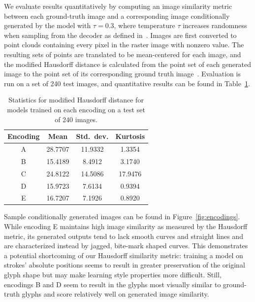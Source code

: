 We evaluate results quantitatively by computing an image similarity metric between each ground-truth image and a corresponding image conditionally generated by the model with $\tau = 0.3$, where temperature $\tau$ increases randomness when sampling from the decoder as defined in~\cite{ha2017neural}.
Images are first converted to point clouds containing every pixel in the raster image with nonzero value.
The resulting sets of points are translated to be mean-centered for each image, and the modified Hausdorff distance is calculated from the point set of each generated image to the point set of its corresponding ground truth image~\cite{dubuisson1994modified}.
Evaluation is run on a set of 240 test images, and quantitative results can be found in Table~\ref{tbl:encoding-results}.

\begin{table}[t]
\centering
\caption[Quantitative results for evaluating feature encodings]{Statistics for modified Hausdorff distance for models trained on each encoding on a test set of 240 images.\label{tbl:encoding-results}}
\begin{tabular}{c c c c}
\toprule
    Encoding & Mean & Std.\ dev. & Kurtosis \\ \midrule
    A & 28.7707 & 11.9332 & 1.3354 \\
    B & 15.4189 & 8.4912 & 3.1740 \\
    C & 24.8122 & 14.5086 & 17.9476 \\
    D & 15.9723 & 7.6134 & 0.9394 \\
    E & 16.7207 & 7.1926 & 0.8920 \\
\end{tabular}
\end{table}

Sample conditionally generated images can be found in Figure~\ref{fig:encodings}.
While encoding E maintains high image similarity as measured by the Hausdorff metric, its generated outputs tend to lack smooth curves and straight lines and are characterized instead by jagged, bite-mark shaped curves.
This demonstrates a potential shortcoming of our Hausdorff similarity metric: training a model on strokes' absolute positions seems to result in greater preservation of the original glyph shape but may make learning style properties more difficult.
Still, encodings B and D seem to result in the glyphs most visually similar to ground-truth glyphs and score relatively well on generated image similarity.

